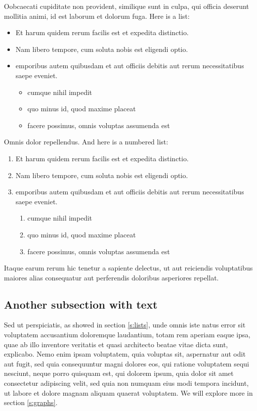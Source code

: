 \documentclass[letterpaper,12pt,leqno]{article}
\begin{document}
Oobcaecati cupiditate non provident, similique sunt in culpa, qui officia deserunt mollitia animi, id est laborum et dolorum fuga. Here is a list:
\begin{itemize}
 	\item Et harum quidem rerum facilis est et expedita distinctio.
 	\item Nam libero tempore, cum soluta nobis est eligendi optio.
 	\item emporibus autem quibusdam et aut officiis debitis aut rerum necessitatibus saepe eveniet.
 		\begin{itemize}
 			\item cumque nihil impedit
 			\item quo minus id, quod maxime placeat
 			\item facere possimus, omnis voluptas assumenda est
 		\end{itemize}
\end{itemize}


Omnis dolor repellendus. And here is a numbered list:
\begin{enumerate}
 	\item Et harum quidem rerum facilis est et expedita distinctio.
 	\item Nam libero tempore, cum soluta nobis est eligendi optio.
 	\item emporibus autem quibusdam et aut officiis debitis aut rerum necessitatibus saepe eveniet.
	\begin{enumerate}
 			\item cumque nihil impedit
 			\item quo minus id, quod maxime placeat
 			\item facere possimus, omnis voluptas assumenda est
 	\end{enumerate}
\end{enumerate}
Itaque earum rerum hic tenetur a sapiente delectus, ut aut reiciendis voluptatibus maiores alias consequatur aut perferendis doloribus asperiores repellat. 

\subsection{Another subsection with text}

Sed ut perspiciatis, as showed in section \ref{s:lists}, unde omnis iste natus error sit voluptatem accusantium doloremque laudantium, totam rem aperiam eaque ipsa, quae ab illo inventore veritatis et quasi architecto beatae vitae dicta sunt, explicabo. Nemo enim ipsam voluptatem, quia voluptas sit, aspernatur aut odit aut fugit, sed quia consequuntur magni dolores eos, qui ratione voluptatem sequi nesciunt, neque porro quisquam est, qui dolorem ipsum, quia dolor sit amet consectetur adipiscing velit, sed quia non numquam eius modi tempora incidunt, ut labore et dolore magnam aliquam quaerat voluptatem. We will explore more in section \ref{s:graphs}.
\end{document}
